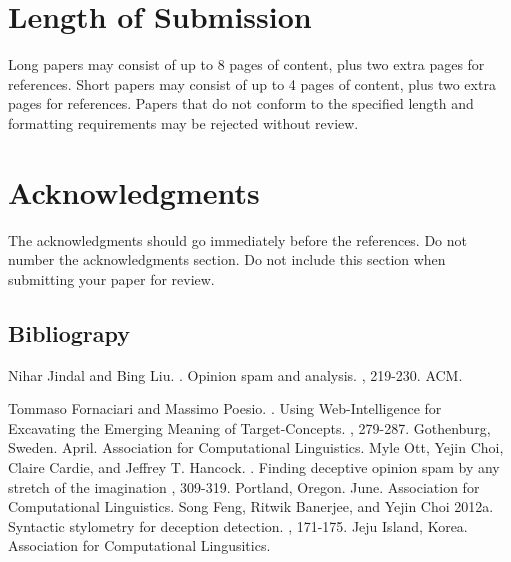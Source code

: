 \documentclass[9pt]{article}
\begin{document}
\section{Length of Submission}
\label{sec:length}

Long papers may consist of up to 8 pages of content, plus two extra
pages for references. Short papers may consist of up to 4 pages of
content, plus two extra pages for references.  Papers that do not
conform to the specified length and formatting requirements may be
rejected without review.



\section*{Acknowledgments}

The acknowledgments should go immediately before the references.  Do
not number the acknowledgments section. Do not include this section
when submitting your paper for review.

%
%



\begin{thebibliography}{}

\section*{Bibliograpy}
Nihar Jindal and Bing Liu.
.
\newblock Opinion spam and analysis. 
, 219-230. ACM.

Tommaso Fornaciari and Massimo Poesio.
.
\newblock Using Web-Intelligence for Excavating the
	Emerging Meaning of Target-Concepts.
, 279-287. Gothenburg, Sweden. April. Association for Computational Linguistics.
Myle Ott, Yejin Choi, Claire Cardie, and Jeffrey T. Hancock.
.
\newblock  Finding deceptive opinion spam by any stretch of the imagination
, 309-319. Portland, Oregon. June. Association for Computational Linguistics.
Song Feng, Ritwik Banerjee, and Yejin Choi
\newblock 2012a.
\newblock Syntactic stylometry for deception detection.
, 171-175. Jeju Island, Korea. Association for Computational Lingusitics.

\end{thebibliography}
\end{document}

